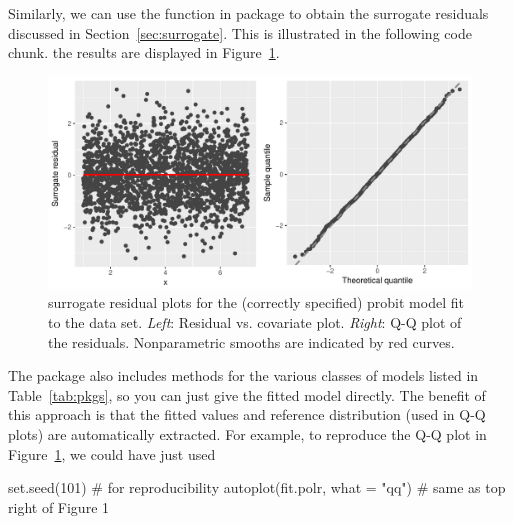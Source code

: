 Similarly, we can use the  function in package  to obtain the surrogate residuals discussed in Section~\ref{sec:surrogate}. This is illustrated in the following code chunk. the results are displayed in Figure~\ref{fig:quadratic-correct-surrogate}.
\begin{figure}[!htbp]
  \centering
  \includegraphics[width=1\textwidth]{quadratic-correct-surrogate}
  \caption{surrogate residual plots for the (correctly specified) probit model fit to the  data set. \textit{Left}: Residual vs. covariate plot. \textit{Right}: Q-Q plot of the residuals. Nonparametric smooths are indicated by red curves.}
  \label{fig:quadratic-correct-surrogate}
\end{figure}

The  package also includes  methods for the various classes of models listed in Table~\ref{tab:pkgs}, so you can just give  the fitted model directly. The benefit of this approach is that the fitted values and reference distribution (used in Q-Q plots) are automatically extracted. For example, to reproduce the Q-Q plot in Figure~\ref{fig:quadratic-correct-surrogate}, we could have just used
\begin{example}
set.seed(101)  # for reproducibility
autoplot(fit.polr, what = "qq")  # same as top right of Figure 1
\end{example}

